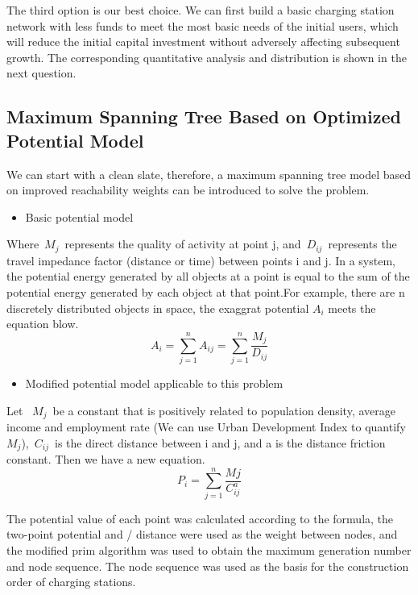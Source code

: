 \documentclass[12pt]{article}  %
\begin{document}
The third option is our best choice. We can first build a basic charging station network with less funds to meet the most basic needs of the initial users, which will reduce the initial capital investment without adversely affecting subsequent growth. The corresponding quantitative analysis and distribution is shown in the next question.
\subsection{Maximum Spanning Tree Based on Optimized Potential Model}
We can start with a clean slate, therefore, a maximum spanning tree model based on improved reachability weights can be introduced to solve the problem.
\begin{itemize}
	\item Basic potential model
\end{itemize}

Where\ ${M_j}$\ represents the quality of activity at point j, and\  ${D_{ij}}$\  represents the travel impedance factor (distance or time) between points i and j.
In a system, the potential energy generated by all objects at a point is equal to the sum of the potential energy generated by each object at that point.For example, there are n discretely distributed objects in space, the exaggrat potential ${A_i}$ meets the equation blow\cite{2}.
\begin{equation}
		A_{i}=\sum\limits_{j=1}^{n} A_{i j}=\sum\limits_{j=1}^{n} \frac{M_{j}}{D_{i j}}
\end{equation}
\begin{itemize}
	\item Modified potential model applicable to this problem
\end{itemize}

Let \ ${M_j}$\  be a constant that is positively related to population density, average income and employment rate (We can use Urban Development Index to quantify ${M_j}$),\  ${C_{ij}}$\  is the direct distance between i and j, and a is the distance friction constant. Then we have a new equation.
\begin{equation}
	P_{i}=\sum_{j=1}^{n} \frac{M j}{C_{i j}^{a}}
\end{equation}

The potential value of each point was calculated according to the formula, the two-point potential and / distance were used as the weight between nodes, and the modified prim algorithm was used to obtain the maximum generation number and node sequence. The node sequence was used as the basis for the construction order of charging stations.
\end{document}
